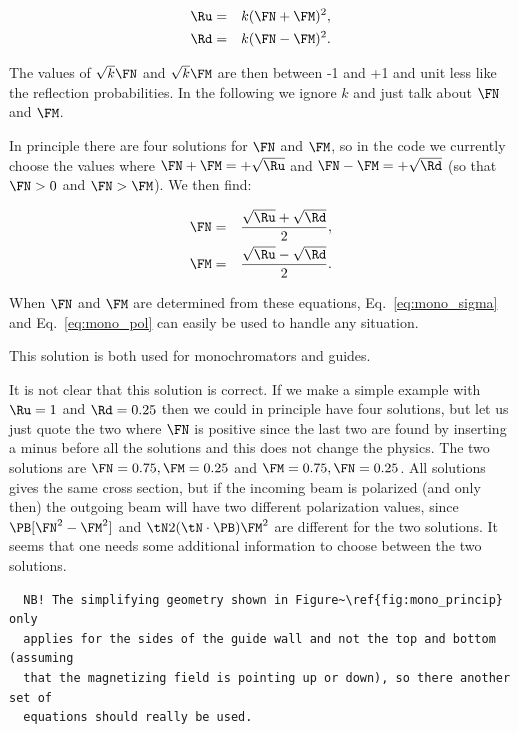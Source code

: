 \begin{eqnarray}
  \label{eq:mono_up}
  \Ru & = & k (\FN + \FM)^2,\\
  \label{eq:mono_down}
  \Rd & = & k (\FN - \FM)^2.
\end{eqnarray}

The values of $\sqrt{k}\FN$ and $\sqrt{k}\FM$ are then between -1 and +1 and
unit less like the reflection probabilities. In the following we ignore $k$ and
just talk about $\FN$ and $\FM$.

In principle there are four solutions for $\FN$ and $\FM$, so in the code we
currently choose the values where $\FN + \FM = +\sqrt{\Ru}$ and $\FN - \FM =
+\sqrt{\Rd}$ (so that $\FN>0$ and $\FN>\FM$). We then find:

\begin{eqnarray}
  \label{eq:mono_nuc}
  \FN & = & \frac{\sqrt{\Ru} + \sqrt{\Rd}}{2},\\
  \label{eq:mono_mag}
  \FM & = & \frac{\sqrt{\Ru} - \sqrt{\Rd}}{2}.
\end{eqnarray}

When $\FN$ and $\FM$ are determined from these equations,
Eq.~\ref{eq:mono_sigma} and Eq.~\ref{eq:mono_pol} can easily be used to handle
any situation.

This solution is both used for monochromators and guides.

It is not clear that this solution is correct. If we make a simple example
with $\Ru = 1$ and $\Rd = 0.25$ then we could in principle have four
solutions, but let us just quote the two where $\FN$ is positive since the
last two are found by inserting a minus before all the solutions and this does
not change the physics. The two solutions are $\FN = 0.75, \FM=0.25$ and $\FM
= 0.75, \FN=0.25$. All solutions gives the same cross section, but if the
incoming beam is polarized (and only then) the outgoing beam will have two
different polarization values, since $\PB [\FN^2 - \FM^2]$ and $\tN 2(\tN
\cdot \PB)\FM^2$ are different for the two solutions. It seems that one needs
some additional information to choose between the two solutions.

\begin{lstlisting}
  NB! The simplifying geometry shown in Figure~\ref{fig:mono_princip} only
  applies for the sides of the guide wall and not the top and bottom (assuming
  that the magnetizing field is pointing up or down), so there another set of
  equations should really be used.
\end{lstlisting}

